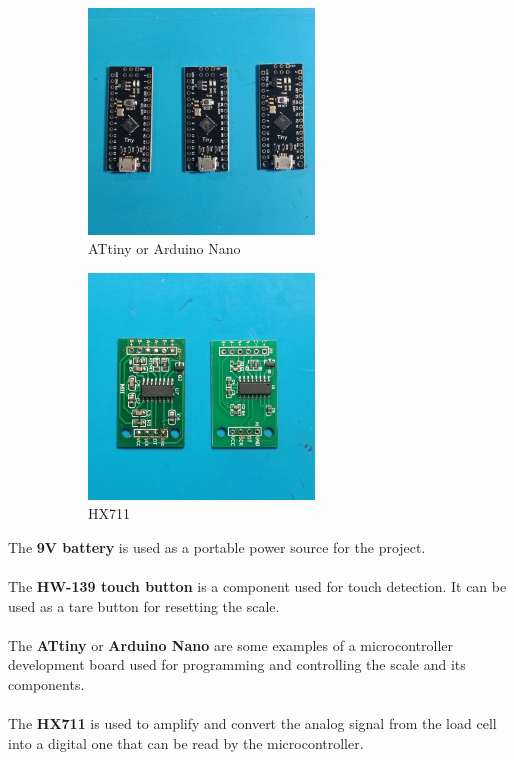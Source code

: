 \begin{figure}[H]
\begin{subfigure}{0.5\textwidth}
\includegraphics[width=0.9\linewidth, height=6cm]{medias/parts/board.jpg} 
\caption{ATtiny or Arduino Nano}
\label{fig:board}
\end{subfigure}
\begin{subfigure}{0.5\textwidth}
\includegraphics[width=0.9\linewidth, height=6cm]{medias/parts/hx711.jpg}
\caption{HX711}
\label{fig:hx711}
\end{subfigure}
\caption{}
\end{figure}

The \textbf{9V battery} is used as a portable power source for the project.\\
\\
The \textbf{HW-139 touch button} is a component used for touch detection. It can be used as a tare button for resetting the scale.\\\\
The \textbf{ATtiny} or \textbf{Arduino Nano} are some examples of a microcontroller development board used for programming and controlling the scale and its components.  \\ 
\\
The \textbf{HX711} is used to amplify and convert the analog signal from the load cell into a digital one that can be read by the microcontroller.\\
\\


